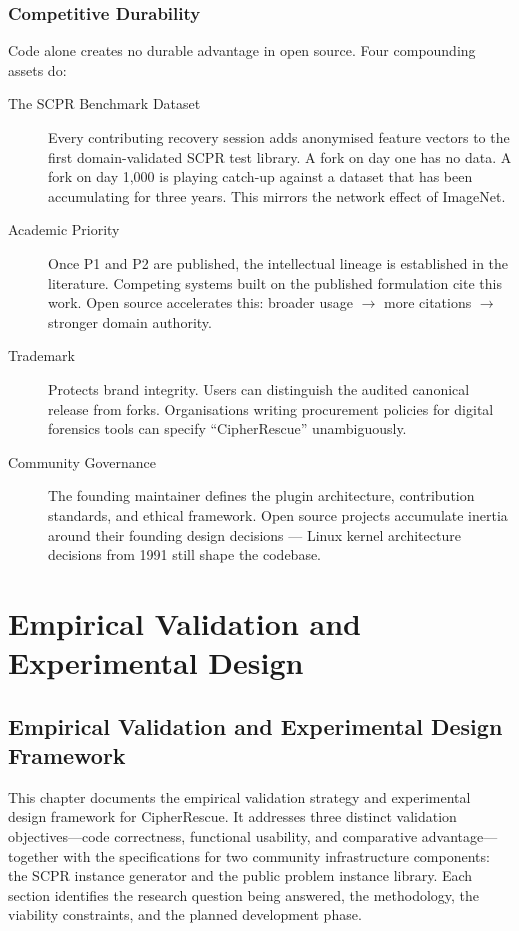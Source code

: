 \documentclass[11pt,a4paper]{report}
\begin{document}
\section{Competitive Durability}

Code alone creates no durable advantage in open source. Four compounding assets do:

\begin{description}
  \item[The SCPR Benchmark Dataset] Every contributing recovery session adds anonymised feature vectors to the first domain-validated SCPR test library. A fork on day one has no data. A fork on day 1,000 is playing catch-up against a dataset that has been accumulating for three years. This mirrors the network effect of ImageNet.
  \item[Academic Priority] Once P1 and P2 are published, the intellectual lineage is established in the literature. Competing systems built on the published formulation cite this work. Open source accelerates this: broader usage $\to$ more citations $\to$ stronger domain authority.
  \item[Trademark] Protects brand integrity. Users can distinguish the audited canonical release from forks. Organisations writing procurement policies for digital forensics tools can specify ``CipherRescue'' unambiguously.
  \item[Community Governance] The founding maintainer defines the plugin architecture, contribution standards, and ethical framework. Open source projects accumulate inertia around their founding design decisions --- Linux kernel architecture decisions from 1991 still shape the codebase.
\end{description}

\part{Empirical Validation and Experimental Design}

\chapter{Empirical Validation and Experimental Design Framework}
\label{ch:empirical}

This chapter documents the empirical validation strategy and experimental design framework
for CipherRescue. It addresses three distinct validation objectives---code correctness,
functional usability, and comparative advantage---together with the specifications for two
community infrastructure components: the SCPR instance generator and the public problem
instance library. Each section identifies the research question being answered, the
methodology, the viability constraints, and the planned development phase.
\end{document}

